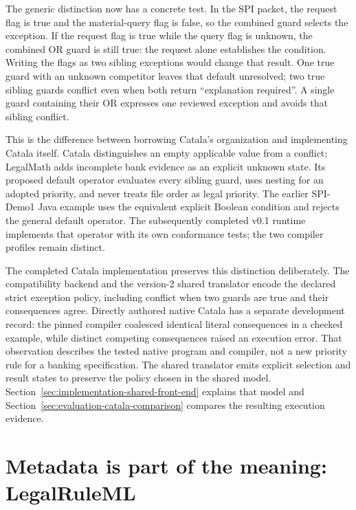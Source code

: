 \documentclass[12pt,a4paper,oneside,openany]{book}
\begin{document}
The generic distinction now has a concrete test. In the SPI packet, the request
flag is true and the material-query flag is false, so the combined guard selects
the exception. If the request flag is true while the query flag is unknown, the
combined OR guard is still true: the request alone establishes the condition.
Writing the flags as two sibling exceptions would change that result. One true
guard with an unknown competitor leaves that default unresolved; two true
sibling guards conflict even when both return ``explanation required''.
A single guard containing their OR expresses one reviewed exception and avoids
that sibling conflict.

This is the difference between borrowing Catala's organization and implementing
Catala itself. Catala distinguishes an empty applicable value from a conflict;
LegalMath adds incomplete bank evidence as an explicit unknown state. Its
proposed default operator evaluates every sibling guard, uses nesting for an
adopted priority, and never treats file order as legal priority. The earlier
SPI-Demo1 Java example uses the equivalent explicit Boolean condition and rejects
the general default operator. The subsequently completed v0.1 runtime implements
that operator with its own conformance tests; the two compiler profiles remain
distinct.

The completed Catala implementation preserves this distinction deliberately.
The compatibility backend and the version-2 shared translator encode the
declared strict exception policy, including conflict when two guards are true
and their consequences agree. Directly authored native Catala has a separate
development record: the pinned compiler coalesced identical literal
consequences in a checked example, while distinct competing consequences raised
an execution error. That observation describes the tested native program and
compiler, not a new priority rule for a banking specification. The shared
translator emits explicit selection and result states to preserve the policy
chosen in the shared model. Section~\ref{sec:implementation-shared-front-end}
explains that model and Section~\ref{sec:evaluation-catala-comparison} compares
the resulting execution evidence.

\section{Metadata is part of the meaning: LegalRuleML}
\label{merge:M04:04}
\end{document}

